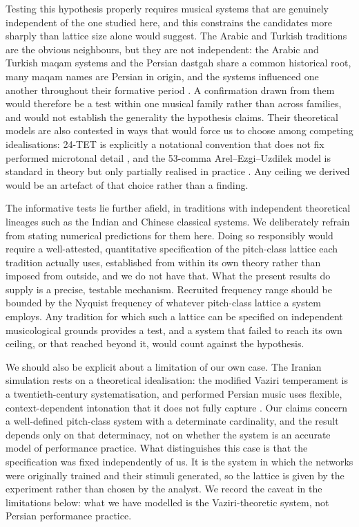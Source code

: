 \documentclass[pdflatex,sn-nature]{sn-jnl}
\begin{document}
Testing this hypothesis properly requires musical systems that are genuinely independent of
the one studied here, and this constrains the candidates more sharply than lattice size
alone would suggest. The Arabic and Turkish traditions are the obvious neighbours, but they
are not independent: the Arabic and Turkish maqam systems and the Persian dastgah share a
common historical root, many maqam names are Persian in origin, and the systems influenced
one another throughout their formative period \cite{touma1996}. A confirmation drawn from
them would therefore be a test within one musical family rather than across families, and
would not establish the generality the hypothesis claims. Their theoretical models are also
contested in ways that would force us to choose among competing idealisations: 24-TET is
explicitly a notational convention that does not fix performed microtonal detail
\cite{touma1996}, and the 53-comma Arel--Ezgi--Uzdilek model is standard in theory but only
partially realised in practice \cite{bozkurt2009}. Any ceiling we derived would be an
artefact of that choice rather than a finding.

The informative tests lie further afield, in traditions with independent theoretical
lineages such as the Indian and Chinese classical systems. We deliberately refrain from
stating numerical predictions for them here. Doing so responsibly would require a
well-attested, quantitative specification of the pitch-class lattice each tradition actually
uses, established from within its own theory rather than imposed from outside, and we do not
have that. What the present results do supply is a precise, testable mechanism. Recruited
frequency range should be bounded by the Nyquist frequency of whatever pitch-class lattice a
system employs. Any tradition for which such a lattice can be specified on independent
musicological grounds provides a test, and a system that failed to reach its own ceiling, or
that reached beyond it, would count against the hypothesis.

We should also be explicit about a limitation of our own case. The Iranian simulation rests
on a theoretical idealisation: the modified Vaziri temperament is a twentieth-century
systematisation, and performed Persian music uses flexible, context-dependent intonation
that it does not fully capture \cite{farhat1990}. Our claims concern a well-defined
pitch-class system with a determinate cardinality, and the result depends only on that
determinacy, not on whether the system is an accurate model of performance practice. What
distinguishes this case is that the specification was fixed independently of us. It is the
system in which the networks were originally trained and their stimuli generated, so the
lattice is given by the experiment rather than chosen by the analyst. We record the caveat
in the limitations below: what we have modelled is the Vaziri-theoretic system, not Persian
performance practice.
\end{document}
